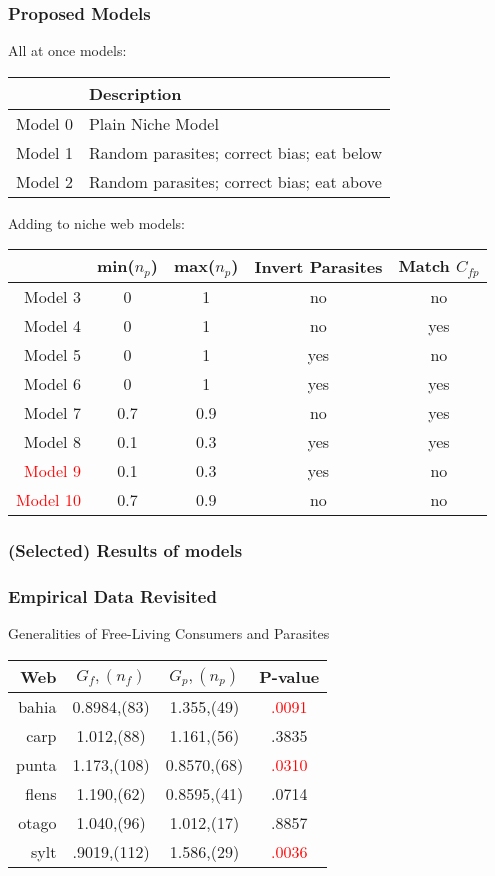 \documentclass{beamer}
\begin{document}
\begin{frame}
\frametitle{Proposed Models}
All at once models:
\begin{tabular}{|r |l|}
\hline
&Description\\
\hline
Model 0& Plain Niche Model\\
Model 1& Random parasites; correct bias; eat below\\
Model 2& Random parasites; correct bias; eat above\\
\hline
\end{tabular}

Adding to niche web models:
\begin{tabular}{|r|c c c c|}
\hline
&min($n_p$)&max($n_p$)&Invert Parasites&Match $C_{fp}$\\
\hline
Model 3 & 0 & 1 & no & no\\
Model 4 & 0 & 1 & no & yes\\
Model 5 & 0 & 1 & yes & no\\
Model 6 & 0 & 1 & yes & yes\\
Model 7 & 0.7 & 0.9 & no & yes\\
Model 8 & 0.1 & 0.3 & yes & yes\\
\textcolor{red}{Model 9} & 0.1 & 0.3 & yes & no\\
\textcolor{red}{Model 10} & 0.7 & 0.9 & no & no\\
\hline
\end{tabular} 
\end{frame}

\begin{frame}
\frametitle{(Selected) Results of models}
\end{frame}

\begin{frame}
\frametitle{Empirical Data Revisited}
Generalities of Free-Living Consumers and Parasites
\begin{tabular}{|r| c c |c|}
\hline
Web& $G_{f},(n_f)$ & $G_p,(n_p)$ &  P-value\\
\hline
bahia&0.8984,(83)&1.355,(49)&\textcolor{red}{.0091}\\
carp&1.012,(88)&1.161,(56)&.3835\\
punta&1.173,(108)&0.8570,(68)&\textcolor{red}{.0310}\\
flens&1.190,(62)&0.8595,(41)&.0714\\
otago&1.040,(96)&1.012,(17)&.8857\\
sylt&.9019,(112)&1.586,(29)&\textcolor{red}{.0036}\\
\hline
\end{tabular}
\end{frame}
\end{document}
